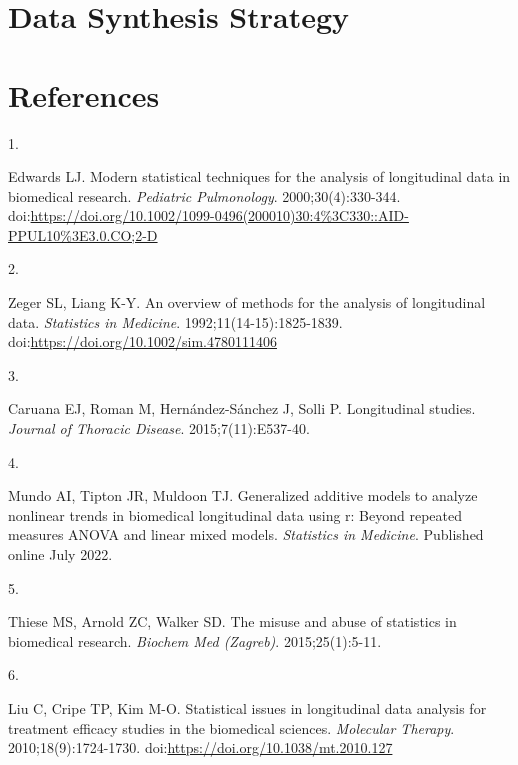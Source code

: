 \documentclass[
]{article}
\newlength{\cslhangindent}
\newlength{\csllabelwidth}
\newlength{\cslentryspacingunit} %
\newenvironment{CSLReferences}[2] %
 {%
  \setlength{\parindent}{0pt}
  \ifodd #1
  \let\oldpar\par
  \def\par{\hangindent=\cslhangindent\oldpar}
  \fi
  \setlength{\parskip}{#2\cslentryspacingunit}
 }%
 {}
\newcommand{\CSLLeftMargin}[1]{\parbox[t]{\csllabelwidth}{#1}}
\newcommand{\CSLRightInline}[1]{\parbox[t]{\linewidth - \csllabelwidth}{#1}\break}
\begin{document}
\hypertarget{data-synthesis-strategy}{%
\section{Data Synthesis Strategy}\label{data-synthesis-strategy}}

\hypertarget{references}{%
\section{References}\label{references}}

\hypertarget{refs}{}
\begin{CSLReferences}{0}{0}
\leavevmode{}%
\CSLLeftMargin{1. }%
\CSLRightInline{Edwards LJ. Modern statistical techniques for the
analysis of longitudinal data in biomedical research. \emph{Pediatric
Pulmonology}. 2000;30(4):330-344.
doi:\url{https://doi.org/10.1002/1099-0496(200010)30:4\%3C330::AID-PPUL10\%3E3.0.CO;2-D}}

\leavevmode{}%
\CSLLeftMargin{2. }%
\CSLRightInline{Zeger SL, Liang K-Y. An overview of methods for the
analysis of longitudinal data. \emph{Statistics in Medicine}.
1992;11(14-15):1825-1839.
doi:\url{https://doi.org/10.1002/sim.4780111406}}

\leavevmode{}%
\CSLLeftMargin{3. }%
\CSLRightInline{Caruana EJ, Roman M, Hernández-Sánchez J, Solli P.
Longitudinal studies. \emph{Journal of Thoracic Disease}.
2015;7(11):E537-40.}

\leavevmode{}%
\CSLLeftMargin{4. }%
\CSLRightInline{Mundo AI, Tipton JR, Muldoon TJ. Generalized additive
models to analyze nonlinear trends in biomedical longitudinal data using
r: Beyond repeated measures {ANOVA} and linear mixed models.
\emph{Statistics in Medicine}. Published online July 2022.}

\leavevmode{}%
\CSLLeftMargin{5. }%
\CSLRightInline{Thiese MS, Arnold ZC, Walker SD. The misuse and abuse of
statistics in biomedical research. \emph{Biochem Med (Zagreb)}.
2015;25(1):5-11.}

\leavevmode{}%
\CSLLeftMargin{6. }%
\CSLRightInline{Liu C, Cripe TP, Kim M-O. Statistical issues in
longitudinal data analysis for treatment efficacy studies in the
biomedical sciences. \emph{Molecular Therapy}. 2010;18(9):1724-1730.
doi:\url{https://doi.org/10.1038/mt.2010.127}}


\end{CSLReferences}
\end{document}
